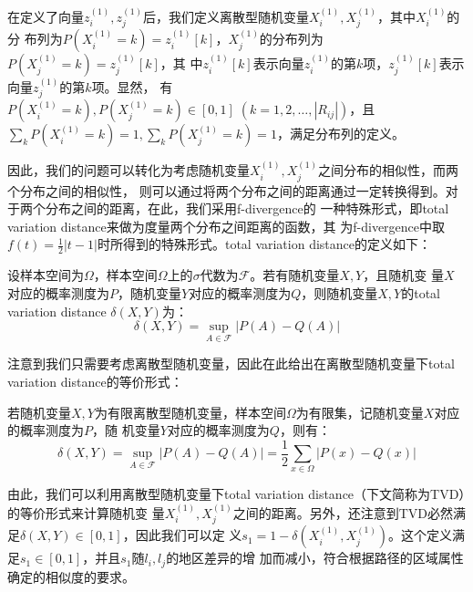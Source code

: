 在定义了向量$z_i^{(1)},z_j^{(1)}$后，我们定义离散型随机变量$X_i^{(1)},X_j^{(1)}$，其中$X_i^{(1)}$的分
布列为$P(X_i^{(1)}=k)=z_i^{(1)}[k]$，$X_j^{(1)}$的分布列为$P(X_j^{(1)}=k)=z_j^{(1)}[k]$，其
中$z_i^{(1)}[k]$表示向量$z_i^{(1)}$的第$k$项，$z_j^{(1)}[k]$表示向量$z_j^{(1)}$的第$k$项。显然，
有$P(X_i^{(1)}=k),P(X_j^{(1)}=k)\in[0,1]\;(k=1,2,\dots,|R_{ij}|)$，且$\sum_kP(X_i^{(1)}=k)=1,
\sum_kP(X_j^{(1)}=k)=1$，满足分布列的定义。

因此，我们的问题可以转化为考虑随机变量$X_i^{(1)},X_j^{(1)}$之间分布的相似性，而两个分布之间的相似性，
则可以通过将两个分布之间的距离通过一定转换得到。对于两个分布之间的距离，在此，我们采用f-divergence的
一种特殊形式，即total variation distance来做为度量两个分布之间距离的函数，其
为f-divergence中取$f(t)=\frac{1}{2}|t-1|$时所得到的特殊形式。total variation distance的定义如下：

\begin{definition}
  设样本空间为$\Omega$，样本空间$\Omega$上的$\sigma$代数为$\mathcal{F}$。若有随机变量$X,Y$，且随机变
  量$X$对应的概率测度为$P$，随机变量$Y$对应的概率测度为$Q$，则随机变量$X,Y$的total variation
  distance $\delta(X,Y)$为：  
\begin{displaymath}
\delta(X,Y)=\sup_{A\in\mathcal{F}}|P(A)-Q(A)|
\end{displaymath}
\end{definition}

注意到我们只需要考虑离散型随机变量，因此在此给出在离散型随机变量下total variation distance的等价形式：

\begin{thm}
  若随机变量$X,Y$为有限离散型随机变量，样本空间$\Omega$为有限集，记随机变量$X$对应的概率测度为$P$，随
  机变量$Y$对应的概率测度为$Q$，则有：
\begin{displaymath}
  \delta(X,Y)=\sup_{A\in\mathcal{F}}|P(A)-Q(A)|=\frac{1}{2}\sum_{x\in\Omega}|P(x)-Q(x)|
\end{displaymath}
\end{thm}

由此，我们可以利用离散型随机变量下total variation distance（下文简称为TVD）的等价形式来计算随机变
量$X_i^{(1)},X_j^{(1)}$之间的距离。另外，还注意到TVD必然满足$\delta(X,Y)\in[0,1]$，因此我们可以定
义$s_1=1-\delta(X_i^{(1)},X_j^{(1)})$。这个定义满足$s_1\in[0,1]$，并且$s_1$随$l_i,l_j$的地区差异的增
加而减小，符合根据路径的区域属性确定的相似度的要求。


